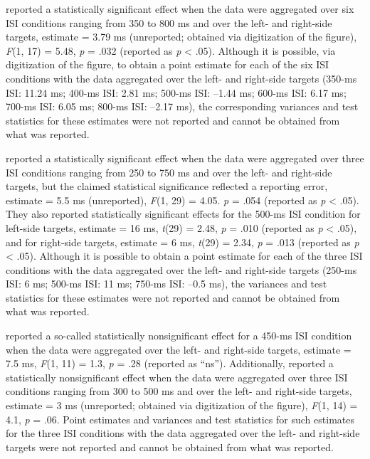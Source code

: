 \documentclass[man,floatsintext]{apa6}
\theoremstyle{definition}
\theoremstyle{definition}
\theoremstyle{definition}
\theoremstyle{remark}
\begin{document}
\textcite{Ristic:2006cr} reported a statistically significant effect
when the data were aggregated over six ISI conditions ranging from 350
to 800 ms and over the left- and right-side targets, estimate = 3.79 ms
(unreported; obtained via digitization of the figure), \emph{F}(1, 17) =
5.48, \emph{p} = .032 (reported as \emph{p} \textless{} .05). Although
it is possible, via digitization of the figure, to obtain a point
estimate for each of the six ISI conditions with the data aggregated
over the left- and right-side targets (350-ms ISI: 11.24 ms; 400-ms ISI:
2.81 ms; 500-ms ISI: --1.44 ms; 600-ms ISI: 6.17 ms; 700-ms ISI: 6.05
ms; 800-ms ISI: --2.17 ms), the corresponding variances and test
statistics for these estimates were not reported and cannot be obtained
from what was reported.

\textcite{Dodd:2008dv} reported a statistically significant effect when
the data were aggregated over three ISI conditions ranging from 250 to
750 ms and over the left- and right-side targets, but the claimed
statistical significance reflected a reporting error, estimate = 5.5 ms
(unreported), \emph{F}(1, 29) = 4.05. \emph{p} = .054 (reported as
\emph{p} \textless{} .05). They also reported statistically significant
effects for the 500-ms ISI condition for left-side targets, estimate =
16 ms, \emph{t}(29) = 2.48, \emph{p} = .010 (reported as \emph{p}
\textless{} .05), and for right-side targets, estimate = 6 ms,
\emph{t}(29) = 2.34, \emph{p} = .013 (reported as \emph{p} \textless{}
.05). Although it is possible to obtain a point estimate for each of the
three ISI conditions with the data aggregated over the left- and
right-side targets (250-ms ISI: 6 ms; 500-ms ISI: 11 ms; 750-ms ISI:
--0.5 ms), the variances and test statistics for these estimates were
not reported and cannot be obtained from what was reported.

\textcite{Salillas2008} reported a so-called statistically
nonsignificant effect for a 450-ms ISI condition when the data were
aggregated over the left- and right-side targets, estimate = 7.5 ms,
\emph{F}(1, 11) = 1.3, \emph{p} = .28 (reported as \enquote{ns}).
Additionally, \textcite{Ranzini2009} reported a statistically
nonsignificant effect when the data were aggregated over three ISI
conditions ranging from 300 to 500 ms and over the left- and right-side
targets, estimate = 3 ms (unreported; obtained via digitization of the
figure), \emph{F}(1, 14) = 4.1, \emph{p} = .06. Point estimates and
variances and test statistics for such estimates for the three ISI
conditions with the data aggregated over the left- and right-side
targets were not reported and cannot be obtained from what was reported.
\end{document}
